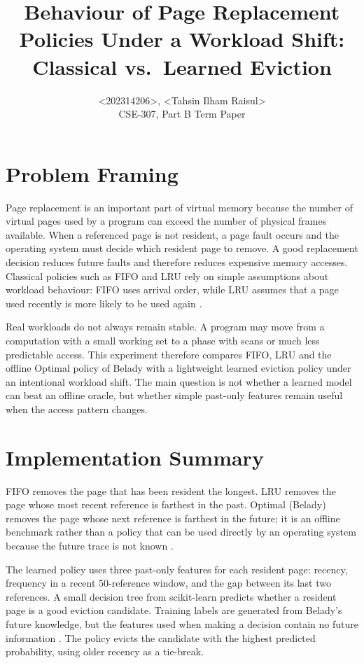 \documentclass[11pt,a4paper]{article}
\title{Behaviour of Page Replacement Policies Under a Workload Shift:\\ Classical vs.\ Learned Eviction}
\author{<202314206>, <Tahsin Ilham Raisul>\\ CSE-307, Part B Term Paper}
\date{}
\begin{document}
\maketitle

\section{Problem Framing}
Page replacement is an important part of virtual memory because the number of virtual pages used by a program can exceed the number of physical frames available. When a referenced page is not resident, a page fault occurs and the operating system must decide which resident page to remove. A good replacement decision reduces future faults and therefore reduces expensive memory accesses. Classical policies such as FIFO and LRU rely on simple assumptions about workload behaviour: FIFO uses arrival order, while LRU assumes that a page used recently is more likely to be used again \cite{silberschatz}.

Real workloads do not always remain stable. A program may move from a computation with a small working set to a phase with scans or much less predictable access. This experiment therefore compares FIFO, LRU and the offline Optimal policy of Belady with a lightweight learned eviction policy under an intentional workload shift. The main question is not whether a learned model can beat an offline oracle, but whether simple past-only features remain useful when the access pattern changes.

\section{Implementation Summary}
FIFO removes the page that has been resident the longest. LRU removes the page whose most recent reference is farthest in the past. Optimal (Belady) removes the page whose next reference is farthest in the future; it is an offline benchmark rather than a policy that can be used directly by an operating system because the future trace is not known \cite{belady}.

The learned policy uses three past-only features for each resident page: recency, frequency in a recent 50-reference window, and the gap between its last two references. A small decision tree from scikit-learn predicts whether a resident page is a good eviction candidate. Training labels are generated from Belady's future knowledge, but the features used when making a decision contain no future information \cite{sklearn}. The policy evicts the candidate with the highest predicted probability, using older recency as a tie-break.
\end{document}
